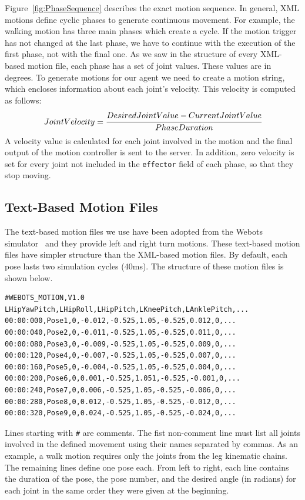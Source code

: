 Figure~\ref{fig:PhaseSequence} describes the exact motion sequence. In general, XML motions define cyclic phases to generate continuous movement. For example, the walking motion has three main phases which create a cycle. If the motion trigger has not changed at the last phase, we have to continue with the execution of the first phase, not with the final one. As we saw in the structure of every XML-based motion file, each phase has a set of joint values. These values are in degrees. To generate motions for our agent we need to create a motion string, which encloses information about each joint's velocity. This velocity is computed as follows:
\[
Joint Velocity = \cfrac{Desired Joint Value - Current Joint Value}{PhaseDuration}
\]
A velocity value is calculated for each joint involved in the motion and the final output of the motion controller is sent to the server. In addition, zero velocity is set for every joint not included in the \texttt{effector} field of each phase, so that they stop moving. 



\subsection{Text-Based Motion Files}
The text-based motion files we use have been adopted from the Webots simulator~\cite{Webots04} and they provide left and right turn motions. These text-based motion files have simpler structure than the XML-based motion files. By default, each pose lasts two simulation cycles (40ms). The structure of these motion files is shown below.
\begin{verbatim}
#WEBOTS_MOTION,V1.0
LHipYawPitch,LHipRoll,LHipPitch,LKneePitch,LAnklePitch,...
00:00:000,Pose1,0,-0.012,-0.525,1.05,-0.525,0.012,0,...
00:00:040,Pose2,0,-0.011,-0.525,1.05,-0.525,0.011,0,...
00:00:080,Pose3,0,-0.009,-0.525,1.05,-0.525,0.009,0,...
00:00:120,Pose4,0,-0.007,-0.525,1.05,-0.525,0.007,0,...
00:00:160,Pose5,0,-0.004,-0.525,1.05,-0.525,0.004,0,...
00:00:200,Pose6,0,0.001,-0.525,1.051,-0.525,-0.001,0,...
00:00:240,Pose7,0,0.006,-0.525,1.05,-0.525,-0.006,0,...
00:00:280,Pose8,0,0.012,-0.525,1.05,-0.525,-0.012,0,...
00:00:320,Pose9,0,0.024,-0.525,1.05,-0.525,-0.024,0,...
\end{verbatim}
Lines starting with \texttt{\#} are comments. The fist non-comment line must list  all joints involved in the defined movement using their names separated by commas. As an example, a walk motion requires only the joints from the leg kinematic chains. The remaining lines define one pose each. From left to right, each line contains the duration of the pose, the pose number, and the desired angle (in radians) for each joint in the same order they were given at the beginning.


